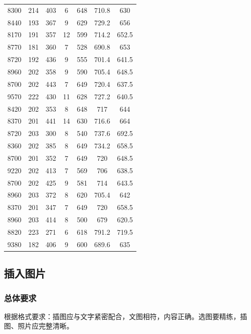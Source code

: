 \begin{longtable}{ccccccc}
      8300  & 214   & 403   & 6     & 648   & 710.8 & 630 \\
      8440  & 193   & 367   & 9     & 629   & 729.2 & 656 \\
      8170  & 191   & 357   & 12    & 599   & 714.2 & 652.5 \\
      8770  & 181   & 360   & 7     & 528   & 690.8 & 653 \\
      8720  & 192   & 436   & 9     & 555   & 701.4 & 641.5 \\
      8960  & 202   & 358   & 9     & 590   & 705.4 & 648.5 \\
      8700  & 202   & 443   & 7     & 649   & 720.4 & 637.5 \\
      9570  & 222   & 430   & 11    & 628   & 727.2 & 640.5 \\
      8420  & 202   & 353   & 8     & 648   & 717   & 644 \\
      8370  & 201   & 441   & 14    & 630   & 716.6 & 664 \\
      8720  & 203   & 300   & 8     & 540   & 737.6 & 692.5 \\
      8360  & 202   & 385   & 8     & 649   & 734.2 & 658.5 \\
      8700  & 201   & 352   & 7     & 649   & 720   & 648.5 \\
      9220  & 202   & 413   & 7     & 569   & 706   & 638.5 \\
      8700  & 202   & 425   & 9     & 581   & 714   & 643.5 \\
      8960  & 203   & 372   & 8     & 620   & 705.4 & 642 \\
      8370  & 201   & 347   & 7     & 649   & 720   & 658.5 \\
      8960  & 203   & 414   & 8     & 500   & 679   & 620.5 \\
      8820  & 223   & 271   & 6     & 618   & 791.2 & 719.5 \\
      9380  & 182   & 406   & 9     & 600   & 689.6 & 635 \\
\end{longtable}

\subsection{插入图片}

\subsubsection{总体要求}

根据格式要求：插图应与文字紧密配合，文图相符，内容正确。选图要精练，插图、照片应完整清晰。

